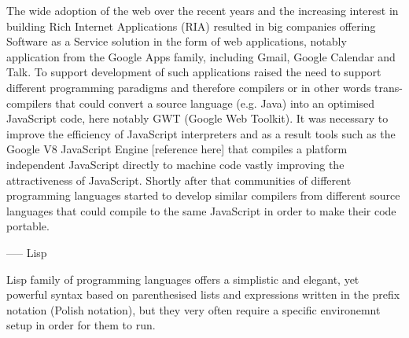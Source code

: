The wide adoption of the web over the recent years and the increasing interest in building Rich Internet Applications (RIA) resulted in big companies offering Software as a Service solution in the form of web applications, notably application from the Google Apps family, including Gmail, Google Calendar and Talk. To support development of such applications raised the need to support different programming paradigms and therefore compilers or in other words trans-compilers that could convert a source language (e.g. Java) into an optimised JavaScript code, here notably GWT (Google Web Toolkit). It was necessary to improve the efficiency of JavaScript interpreters and as a result tools such as the Google V8 JavaScript Engine [reference here] that compiles a platform independent JavaScript directly to machine code vastly improving the attractiveness of JavaScript. Shortly after that communities of different programming languages started to develop similar compilers from different source languages that could compile to the same JavaScript in order to make their code portable.


-----
Lisp

Lisp family of programming languages offers a simplistic and elegant, yet powerful syntax based on parenthesised lists and expressions written in the prefix notation (Polish notation), but they very often require a specific environemnt setup in order for them to run. 
